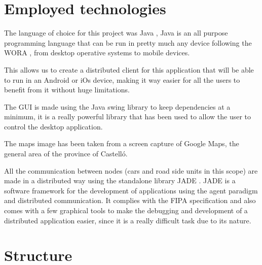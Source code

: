 \section{Employed technologies}

The language of choice for this project was Java \cite{java}, Java is an all purpose programming language that can be run in pretty much any device following the WORA \cite{wikipedia_wora}, from desktop operative systems to mobile devices.

This allows us to create a distributed client for this application that will be able to run in an Android or iOs device, making it way easier for all the users to benefit from it without huge limitations.

The GUI is made using the Java swing library \cite{swing} to keep dependencies at a minimum, it is a really powerful library that has been used to allow the user to control the desktop application.

The maps image has been taken from a screen capture of Google Maps, the general area of the province of Castell\'{o}.

All the communication between nodes (cars and road side units in this scope) are made in a distributed way using the standalone library JADE \cite{jade}. JADE is a software framework for the development of applications using the agent paradigm and distributed communication. It complies with the FIPA specification \cite{fipa} and also comes with a few graphical tools to make the debugging and development of a distributed application easier, since it is a really difficult task due to its nature.

\section{Structure}

